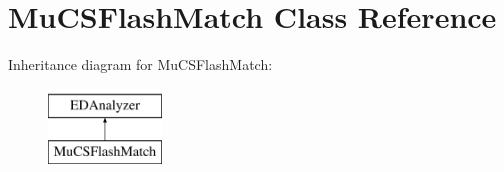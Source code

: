 \hypertarget{classMuCSFlashMatch}{}\section{Mu\+C\+S\+Flash\+Match Class Reference}
\label{classMuCSFlashMatch}
Inheritance diagram for Mu\+C\+S\+Flash\+Match\+:\begin{figure}[H]
\begin{center}
\leavevmode
\includegraphics[height=2.000000cm]{classMuCSFlashMatch}
\end{center}
\end{figure}
